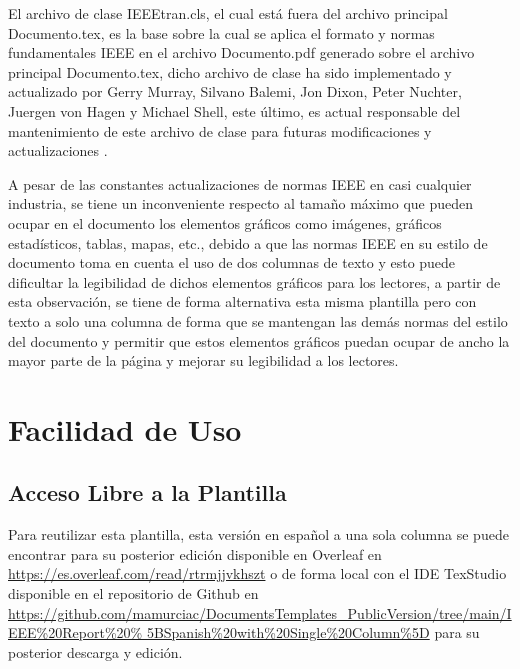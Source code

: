 \documentclass[letterpaper, 10pt, conference]{IEEEtran} %
\begin{document}
	El archivo de clase IEEEtran.cls, el cual está fuera del archivo principal Documento.tex, es la base sobre la cual se aplica el formato y normas fundamentales IEEE en el archivo Documento.pdf generado sobre el archivo principal Documento.tex, dicho archivo de clase ha sido implementado y actualizado por Gerry Murray, Silvano Balemi, Jon Dixon, Peter Nuchter, Juergen von Hagen y Michael Shell, este último, es actual responsable del mantenimiento de este archivo de clase para futuras modificaciones y actualizaciones \cite{referenciaBibliografica2}.
	
	A pesar de las constantes actualizaciones de normas IEEE en casi cualquier industria, se tiene un inconveniente respecto al tamaño máximo que pueden ocupar en el documento los elementos gráficos como imágenes, gráficos estadísticos, tablas, mapas, etc., debido a que las normas IEEE en su estilo de documento toma en cuenta el uso de dos columnas de texto y esto puede dificultar la legibilidad de dichos elementos gráficos para los lectores, a partir de esta observación, se tiene de forma alternativa esta misma plantilla pero con texto a solo una columna de forma que se mantengan las demás normas del estilo del documento y permitir que estos elementos gráficos puedan ocupar de ancho la mayor parte de la página y mejorar su legibilidad a los lectores.
	
	\section{Facilidad de Uso} \label{seccionFacilidadDeUso}
	\subsection{Acceso Libre a la Plantilla} \label{subseccionAccesoLibreALaPlantilla}
	Para reutilizar esta plantilla, esta versión en español a una sola columna se puede encontrar para su posterior edición disponible en Overleaf en \href{https://es.overleaf.com/read/rtrmjjvkhszt}{https://es.overleaf.com/read/rtrmjjvkhszt} o de forma local con el IDE TexStudio disponible en el repositorio de Github en \href{https://github.com/mamurciac/DocumentsTemplates_PublicVersion/tree/main/IEEE%20Report%20%5BSpanish%20with%20Single%20Column%5D}{https://github.com/mamurciac/DocumentsTemplates\_PublicVersion/tree/main/IEEE\%20Report\%20\% 5BSpanish\%20with\%20Single\%20Column\%5D} para su posterior descarga y edición.
	
\end{document}
